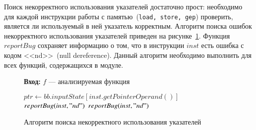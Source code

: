 Поиск некорректного использования указателей достаточно прост: необходимо для
каждой инструкции работы с памятью~(\texttt{load, store, gep}) проверить, 
является ли используемый в ней указатель корректным. Алгоритм поиска ошибок
некорректного использования указателей приведен на 
рисунке~\ref{image:ndChecker}. Функция $reportBug$ сохраняет информацию
о том, что в инструкции $inst$ есть ошибка с кодом <<nd>>~(null dereference). 
Данный алгоритм необходимо выполнить для всех функций, содержащихся в модуле.
\begin{figure}[h!]
\textbf{Вход:} $f$ --- анализируемая функция

\begin{algorithmic}[1]
            \State $ptr \gets bb.inputState[inst.getPointerOperand()]$
                \State $reportBug(inst, "nd")$
                \State $reportBug(inst, "nd")$
            \EndIf
        \EndIf
    \EndFor
\EndFor
\end{algorithmic}
\caption{Алгоритм поиска некорректного использования указателей}
\label{image:ndChecker}
\end{figure}

